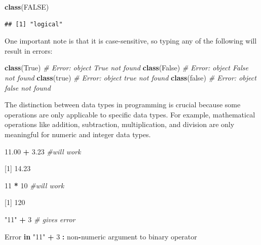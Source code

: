 \documentclass[
]{book}
\newenvironment{Shaded}{\begin{snugshade}}{\end{snugshade}}
\newcommand{\CommentTok}[1]{\textcolor[rgb]{0.56,0.35,0.01}{\textit{#1}}}
\newcommand{\ConstantTok}[1]{\textcolor[rgb]{0.56,0.35,0.01}{#1}}
\newcommand{\ControlFlowTok}[1]{\textcolor[rgb]{0.13,0.29,0.53}{\textbf{#1}}}
\newcommand{\DecValTok}[1]{\textcolor[rgb]{0.00,0.00,0.81}{#1}}
\newcommand{\FloatTok}[1]{\textcolor[rgb]{0.00,0.00,0.81}{#1}}
\newcommand{\FunctionTok}[1]{\textcolor[rgb]{0.13,0.29,0.53}{\textbf{#1}}}
\newcommand{\NormalTok}[1]{#1}
\newcommand{\SpecialCharTok}[1]{\textcolor[rgb]{0.81,0.36,0.00}{\textbf{#1}}}
\newcommand{\StringTok}[1]{\textcolor[rgb]{0.31,0.60,0.02}{#1}}
\begin{document}
\begin{Shaded}
\begin{Highlighting}[]
\FunctionTok{class}\NormalTok{(}\ConstantTok{FALSE}\NormalTok{)}
\end{Highlighting}
\end{Shaded}

\begin{verbatim}
## [1] "logical"
\end{verbatim}

One important note is that it is case-sensitive, so typing any of the following will result in errors:

\begin{Shaded}
\begin{Highlighting}[]
\FunctionTok{class}\NormalTok{(True)   }\CommentTok{\# Error: object \textquotesingle{}True\textquotesingle{} not found}
\FunctionTok{class}\NormalTok{(False)  }\CommentTok{\# Error: object \textquotesingle{}False\textquotesingle{} not found}
\FunctionTok{class}\NormalTok{(true)   }\CommentTok{\# Error: object \textquotesingle{}true\textquotesingle{} not found}
\FunctionTok{class}\NormalTok{(false)  }\CommentTok{\# Error: object \textquotesingle{}false\textquotesingle{} not found}
\end{Highlighting}
\end{Shaded}

The distinction between data types in programming is crucial because some operations are only applicable to specific data types. For example, mathematical operations like addition, subtraction, multiplication, and division are only meaningful for numeric and integer data types.

\begin{Shaded}
\begin{Highlighting}[]
\FloatTok{11.00} \SpecialCharTok{+} \FloatTok{3.23} \CommentTok{\#will work}

\NormalTok{[}\DecValTok{1}\NormalTok{] }\FloatTok{14.23}


\DecValTok{11} \SpecialCharTok{*} \DecValTok{10} \CommentTok{\#will work}

\NormalTok{[}\DecValTok{1}\NormalTok{] }\DecValTok{120}

\StringTok{"11"} \SpecialCharTok{+} \DecValTok{3} \CommentTok{\# gives error}

\NormalTok{Error }\ControlFlowTok{in} \StringTok{"11"} \SpecialCharTok{+} \DecValTok{3} \SpecialCharTok{:}\NormalTok{ non}\SpecialCharTok{{-}}\NormalTok{numeric argument to binary operator}
\end{Highlighting}
\end{Shaded}
\end{document}
